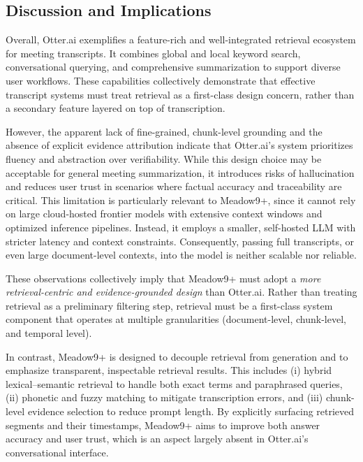 \subsection{Discussion and Implications}
Overall, Otter.ai exemplifies a feature-rich and well-integrated retrieval ecosystem for meeting transcripts. It combines global and local keyword search, conversational querying, and comprehensive summarization to support diverse user workflows. These capabilities collectively demonstrate that effective transcript systems must treat retrieval as a first-class design concern, rather than a secondary feature layered on top of transcription.

However, the apparent lack of fine-grained, chunk-level grounding and the absence of explicit evidence attribution indicate that Otter.ai’s system prioritizes fluency and abstraction over verifiability. While this design choice may be acceptable for general meeting summarization, it introduces risks of hallucination and reduces user trust in scenarios where factual accuracy and traceability are critical. This limitation is particularly relevant to Meadow9+, since it cannot rely on large cloud-hosted frontier models with extensive context windows and optimized inference pipelines. Instead, it employs a smaller, self-hosted LLM with stricter latency and context constraints. Consequently, passing full transcripts, or even large document-level contexts, into the model is neither scalable nor reliable.

These observations collectively imply that Meadow9+ must adopt a \textit{more retrieval-centric and evidence-grounded design} than Otter.ai. Rather than treating retrieval as a preliminary filtering step, retrieval must be a first-class system component that operates at multiple granularities (document-level, chunk-level, and temporal level).

In contrast, Meadow9+ is designed to decouple retrieval from generation and to emphasize transparent, inspectable retrieval results. This includes (i) hybrid lexical--semantic retrieval to handle both exact terms and paraphrased queries, (ii) phonetic and fuzzy matching to mitigate transcription errors, and (iii) chunk-level evidence selection to reduce prompt length. By explicitly surfacing retrieved segments and their timestamps, Meadow9+ aims to improve both answer accuracy and user trust, which is an aspect largely absent in Otter.ai’s conversational interface.

